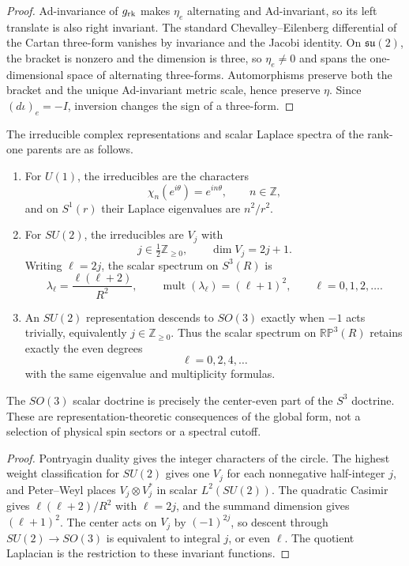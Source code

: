 \documentclass[11pt,a4paper]{article}
\begin{document}
\begin{proof}
Ad-invariance of \(g_{\rm rk}\) makes
\(\eta_e\) alternating and Ad-invariant, so its left translate is also right
invariant.  The standard Chevalley--Eilenberg differential of the Cartan
three-form vanishes by invariance and the Jacobi identity.  On
\(\mathfrak{su}(2)\), the bracket is nonzero and the dimension is three, so
\(\eta_e\ne0\) and spans the one-dimensional space of alternating
three-forms.  Automorphisms preserve both the bracket and the unique
Ad-invariant metric scale, hence preserve \(\eta\).  Since
\((d\iota)_e=-I\), inversion changes the sign of a three-form.
\end{proof}

\begin{theorem}
\label{p2:thm:rank-one-representation-descent}
The irreducible complex representations and scalar Laplace spectra of the
rank-one parents are as follows.
\begin{enumerate}[label=(\roman*), leftmargin=2em]
\item For \(U(1)\), the irreducibles are the characters
\[
 \chi_n(e^{i\theta})=e^{in\theta},\qquad n\in\mathbb Z,
\]
and on \(S^1(r)\) their Laplace eigenvalues are \(n^2/r^2\).
\item For \(SU(2)\), the irreducibles are \(V_j\) with
\[
 j\in\tfrac12\mathbb Z_{\ge0},\qquad \dim V_j=2j+1.
\]
Writing \(\ell=2j\), the scalar spectrum on \(S^3(R)\) is
\[
 \lambda_\ell=\frac{\ell(\ell+2)}{R^2},
 \qquad
 \operatorname{mult}(\lambda_\ell)=(\ell+1)^2,
 \qquad \ell=0,1,2,\ldots.
\]
\item An \(SU(2)\) representation descends to \(SO(3)\) exactly when
\(-1\) acts trivially, equivalently \(j\in\mathbb Z_{\ge0}\).  Thus the
scalar spectrum on \(\mathbb{RP}^3(R)\) retains exactly the even degrees
\[
 \ell=0,2,4,\ldots
\]
with the same eigenvalue and multiplicity formulas.
\end{enumerate}
The \(SO(3)\) scalar doctrine is precisely the center-even part of the
\(S^3\) doctrine.  These are representation-theoretic consequences of the
global form, not a selection of physical spin sectors or a spectral cutoff.
\end{theorem}

\begin{proof}
Pontryagin duality gives the integer characters of the circle.  The highest
weight classification for \(SU(2)\) gives one \(V_j\) for each nonnegative
half-integer \(j\), and Peter--Weyl places
\(V_j\otimes V_j^*\) in scalar \(L^2(SU(2))\).  The quadratic Casimir gives
\(\ell(\ell+2)/R^2\) with \(\ell=2j\), and the summand dimension gives
\((\ell+1)^2\).  The center acts on \(V_j\) by
\((-1)^{2j}\), so descent through \(SU(2)\to SO(3)\) is equivalent to
integral \(j\), or even \(\ell\).  The quotient Laplacian is the restriction
to these invariant functions.
\end{proof}
\end{document}
